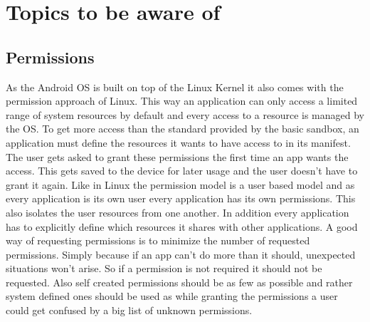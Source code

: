 \chapter{Topics to be aware of}
\label{chp:howto}

\section{Permissions}
\label{chp:howto:sec:permissions}

As the Android OS is built on top of the Linux Kernel it also comes with the permission approach of Linux. This way an application can only access a limited range of system resources by default and every access to a resource is managed by the OS.
To get more access than the standard provided by the basic sandbox, an application must define the resources it wants to have access to in its manifest. The user gets asked to grant these permissions the first time an app wants the access. This gets saved to the device for later usage and the user doesn't have to grant it again.
Like in Linux the permission model is a user based model and as every application is its own user every application has its own permissions. This also isolates the user resources from one another. In addition every application has to explicitly define which resources it shares with other applications.
A good way of requesting permissions is to minimize the number of requested permissions. Simply because if an app can't do more than it should, unexpected situations won't arise. So if a permission is not required it should not be requested.
Also self created permissions should be as few as possible and rather system defined ones should be used as while granting the permissions a user could get confused by a big list of unknown permissions.